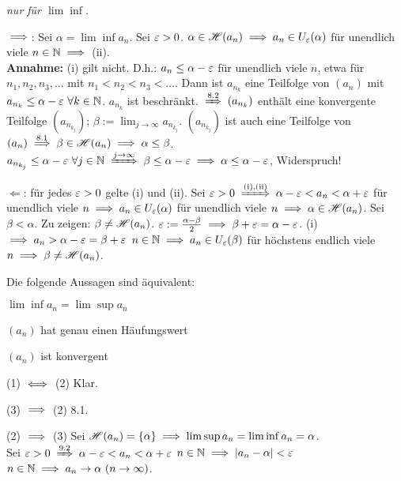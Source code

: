 \documentclass[a4paper,twoside,DIV15,BCOR12mm]{scrbook}
\begin{document}
\begin{beweis}
\textit{nur für $\lim\inf$}.

\glqq$\implies$\grqq: Sei $\alpha = \lim\inf a_n$. Sei $\varepsilon > 0 $. $\alpha\in\mathscr{H}(a_n) \implies a_n \in U_\varepsilon(\alpha)$ für unendlich viele $n\in\mathbb{N} \implies$ (ii). \\
\textbf{Annahme:} (i) gilt nicht. D.h.: $a_n \le \alpha - \varepsilon$ für unendlich viele $n$, etwa für $n_1, n_2, n_3,\ldots$ mit $n_1 < n_2 < n_3 <\ldots$. Dann ist $a_{n_k}$ eine Teilfolge von $(a_n)$ mit $a_{n_k} \le \alpha-\varepsilon \ \forall k \in\mathbb{N}$. $a_{n_k}$ ist beschränkt. $\folgtwegen{8.2} (a_{n_k})$ enthält eine konvergente Teilfolge $(a_{n_{k_j}})$; $\displaystyle\beta := \lim_{j\to\infty} a_{n_{k_j}}$. $(a_{n_{k_j}})$ ist auch eine Teilfolge von $(a_n) \folgtwegen{8.1} \beta \in\H(a_n) \folgt \alpha \le \beta$. $a_{n_{k_j}} \le \alpha -\ep \ \forall j \in\MdN \folgtwegen{j\to\infty} \beta \le \alpha-\ep \folgt \alpha \le \alpha - \ep$, Widerspruch!

\glqq$\Leftarrow$\grqq: für jedes $\varepsilon>0$ gelte (i) und (ii). Sei $\ep>0\folgtnach{(i),(ii)} \alpha -\ep < a_n < \alpha+\ep$ für unendlich viele $n \implies a_n\in U_\varepsilon(\alpha)$ für unendlich viele $n \implies \alpha \in \mathscr{H}(a_n)$. Sei $\beta < \alpha$. Zu zeigen: $\beta \ne \mathscr{H}(a_n)$.  $\varepsilon := \frac{\alpha -\beta}{2} \implies \beta + \varepsilon = \alpha - \varepsilon$. (i) $\implies a_n > \alpha - \varepsilon = \beta + \varepsilon$ \ffa $n\in\mathbb{N} \implies a_n\in U_\varepsilon(\beta)$ für höchstens endlich viele $n \implies \beta \ne \mathscr{H}(a_n)$.
\end{beweis}

\begin{satz}
Die folgende  Aussagen sind äquivalent:
\begin{liste}
\item $\lim\inf a_n = \lim\sup a_n$
\item $(a_n)$ hat genau einen Häufungswert
\item $(a_n)$ ist konvergent
\end{liste}
\end{satz}

\begin{beweise}
\item{(1) $\iff$ (2)} Klar.
\item{(3) $\implies$ (2)} 8.1.
\item{(2) $\implies$ (3)} Sei $\mathscr{H}(a_n) = \{\alpha\} \implies \lim\sup a_n = \lim\inf a_n = \alpha$.\\
Sei $\ep>0 \folgtnach{9.2} \alpha - \ep < a_n < \alpha + \ep$ \ffa $n\in\mathbb{N} \implies |a_n- \alpha| < \varepsilon$ \ffa $n\in\MdN \folgt a_n\to\alpha \ (n\to\infty)$.
\end{beweise}
\end{document}
